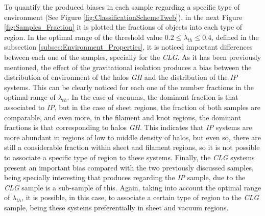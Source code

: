 To quantify the produced biases in each sample regarding a specific type
of environment (See Figure \ref{fig:ClassificationSchemeTweb}), in the 
next Figure \ref{fig:Samples_Fraction} it is plotted the fractions of 
objects into each type of region. In the optimal range of the threshold 
value $0.2\leq \lambda_{th}\leq 0.4$, defined in the subsection 
\ref{subsec:Environment_Properties}, it is noticed important differences
between each one of the samples, specially for the \textit{CLG}. As it has
been previously mentioned, the effect of the gravitational isolation 
produces a bias between the distribution of environment of the halos 
\textit{GH} and the distribution of the \textit{IP} systems. This can be 
clearly noticed for each one of the number fractions in the optimal range 
of $\lambda_{th}$. In the case of vacuums, the dominant fraction is that 
associated to \textit{IP}, but in the case of sheet regions, the fraction
of both samples are comparable, and even more, in the filament and knot 
regions, the dominant fractions is that corresponding to halos \textit{GH}.
This indicates that \textit{IP} systems are more abundant in regions of 
low to middle density of halos, but even so, there are still a 
considerable fraction within sheet and filament regions, so it is not 
possible to associate a specific type of region to these systems. Finally,
the \textit{CLG} systems present an important bias compared with the two
previously discussed samples, being specially interesting that produces
regarding the \textit{IP} sample, due to the \textit{CLG} sample is a 
sub-sample of this. Again, taking into account the optimal range of
$\lambda_{th}$, it is possible, in this case, to associate a certain type
of region to the \textit{CLG} sample, being these systems preferentially
in sheet and vacuum regions.


